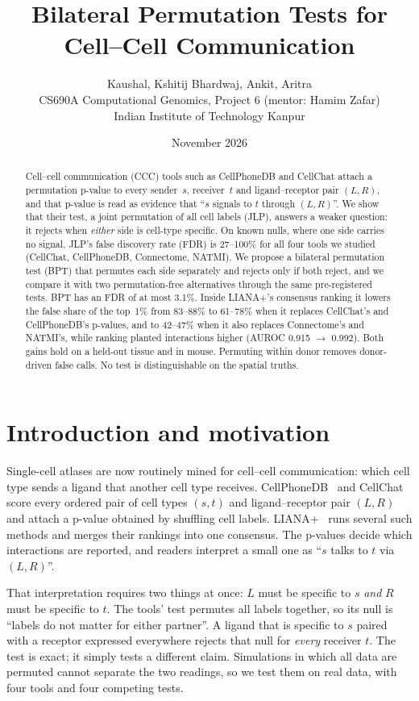 \documentclass[11pt]{article}
\title{\vspace{-1.2em}Bilateral Permutation Tests for Cell--Cell Communication}
\author{Kaushal, Kshitij Bhardwaj, Ankit, Aritra\\[2pt]
\small CS690A Computational Genomics, Project 6 \quad (mentor: Hamim Zafar)\\
\small Indian Institute of Technology Kanpur}
\date{November 2026}
\newcommand{\JLP}{JLP}
\newcommand{\BPT}{BPT}
\begin{document}
\maketitle

\begin{abstract}
\noindent
Cell--cell communication (CCC) tools such as CellPhoneDB and CellChat attach a permutation p-value to every
sender~$s$, receiver~$t$ and ligand--receptor pair $(L,R)$, and that p-value is read as evidence that ``$s$ signals to
$t$ through $(L,R)$''. We show that their test, a joint permutation of all cell labels (\JLP), answers a weaker
question: it rejects when \emph{either} side is cell-type specific. On known nulls, where one side carries no signal,
\JLP's false discovery rate (FDR) is 27--100\% for all four tools we studied (CellChat, CellPhoneDB, Connectome,
NATMI). We propose a bilateral permutation test (\BPT) that permutes each side separately and rejects only if both
reject, and we compare it with two permutation-free alternatives through the same pre-registered tests. \BPT{} has an
FDR of at most 3.1\%. Inside LIANA+'s consensus ranking it lowers the false share of the top~1\% from 83--88\% to
61--78\% when it replaces CellChat's and CellPhoneDB's p-values, and to 42--47\% when it also replaces Connectome's
and NATMI's, while ranking planted interactions higher (AUROC 0.915 $\to$ 0.992). Both gains hold on a held-out
tissue and in mouse. Permuting within donor removes donor-driven false calls. No test is distinguishable on the
spatial truths.
\end{abstract}

\section{Introduction and motivation}

Single-cell atlases are now routinely mined for cell--cell communication: which cell type sends a ligand that
another cell type receives. CellPhoneDB~\cite{efremova2020} and CellChat~\cite{jin2021} score every ordered pair of
cell types $(s,t)$ and ligand--receptor pair $(L,R)$ and attach a p-value obtained by shuffling cell labels.
LIANA+~\cite{dimitrov2022,dimitrov2024} runs several such methods and merges their rankings into one consensus.
The p-values decide which interactions are reported, and readers interpret a small one as ``$s$ talks to $t$ via
$(L,R)$''.

That interpretation requires two things at once: $L$ must be specific to $s$ \emph{and} $R$ must be specific to $t$.
The tools' test permutes all labels together, so its null is ``labels do not matter for either partner''. A ligand
that is specific to $s$ paired with a receptor expressed everywhere rejects that null for \emph{every} receiver $t$.
The test is exact; it simply tests a different claim. Simulations in which all data are permuted cannot separate the two readings, so we
test them on real data, with four tools and four competing tests.
\end{document}
